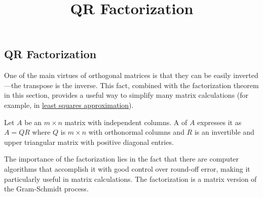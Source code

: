 \documentclass{ximera}
\title{QR Factorization} \license{CC BY-NC-SA 4.0}
\begin{document}
\begin{abstract}

\end{abstract}
\maketitle

\begin{onlineOnly}
\section*{QR Factorization}
\end{onlineOnly}

One of the main virtues of orthogonal
matrices is that they can be easily inverted---the transpose is the
inverse. This fact, combined with the factorization theorem in this
section, provides a useful way to simplify many matrix calculations (for
 example, in \href{\xmbaseurl/RTH-0030/main}{least squares approximation}).


\begin{definition}\label{def:QR-factorization}
Let $A$ be an $m \times n$ matrix with independent columns. A  of $A$ expresses it as $A = QR$ where $Q$ is $m \times n$ with orthonormal columns and $R$ is an invertible and upper triangular matrix with positive diagonal entries.
\end{definition}

The importance of the factorization
lies in the fact that there are computer algorithms that accomplish it
with good control over round-off error, making it particularly useful in
 matrix calculations. The factorization is a matrix version of the Gram-Schmidt process.
\end{document}

